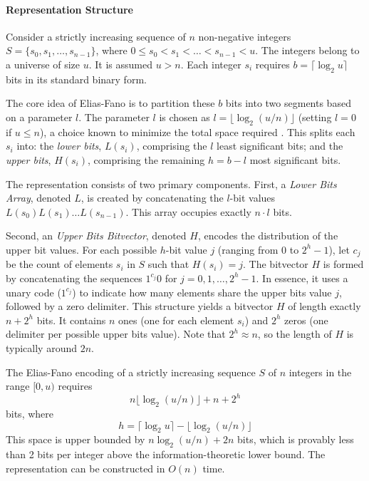 \paragraph{Representation Structure}
Consider a strictly increasing sequence of $n$ non-negative integers $S = \{s_0, s_1, \ldots, s_{n-1}\}$, where $0 \le s_0 < s_1 < \ldots < s_{n-1} < u$. The integers belong to a universe of size $u$. It is assumed $u > n$. Each integer $s_i$ requires $b = \lceil \log_2 u \rceil$ bits in its standard binary form.

The core idea of Elias-Fano is to partition these $b$ bits into two segments based on a parameter $l$. The parameter $l$ is chosen as $l = \lfloor \log_2 (u/n) \rfloor$ (setting $l=0$ if $u \le n$), a choice known to minimize the total space required \cite{Elias1975}. This splits each $s_i$ into: the \emph{lower bits}, $L(s_i)$, comprising the $l$ least significant bits; and the \emph{upper bits}, $H(s_i)$, comprising the remaining $h = b - l$ most significant bits.

The representation consists of two primary components. First, a \emph{Lower Bits Array}, denoted $L$, is created by concatenating the $l$-bit values $L(s_0)L(s_1) \ldots L(s_{n-1})$. This array occupies exactly $n \cdot l$ bits.

Second, an \emph{Upper Bits Bitvector}, denoted $H$, encodes the distribution of the upper bit values. For each possible $h$-bit value $j$ (ranging from $0$ to $2^h-1$), let $c_j$ be the count of elements $s_i$ in $S$ such that $H(s_i) = j$. The bitvector $H$ is formed by concatenating the sequences $1^{c_j}0$ for $j = 0, 1, \ldots, 2^h-1$. In essence, it uses a unary code ($1^{c_j}$) to indicate how many elements share the upper bits value $j$, followed by a zero delimiter. This structure yields a bitvector $H$ of length exactly $n + 2^h$ bits. It contains $n$ ones (one for each element $s_i$) and $2^h$ zeros (one delimiter per possible upper bits value). Note that $2^h \approx n$, so the length of $H$ is typically around $2n$.

\begin{theorem} \label{thm:ef_space}
    The Elias-Fano encoding of a strictly increasing sequence $S$ of $n$ integers in the range $[0, u)$ requires
    \[n \lfloor \log_2 (u/n) \rfloor + n + 2^h\]
    bits, where
    \[h = \lceil \log_2 u \rceil - \lfloor \log_2 (u/n) \rfloor\]
    This space is upper bounded by $n \log_2(u/n) + 2n$ bits, which is provably less than 2 bits per integer above the information-theoretic lower bound. The representation can be constructed in $O(n)$ time.
\end{theorem}

